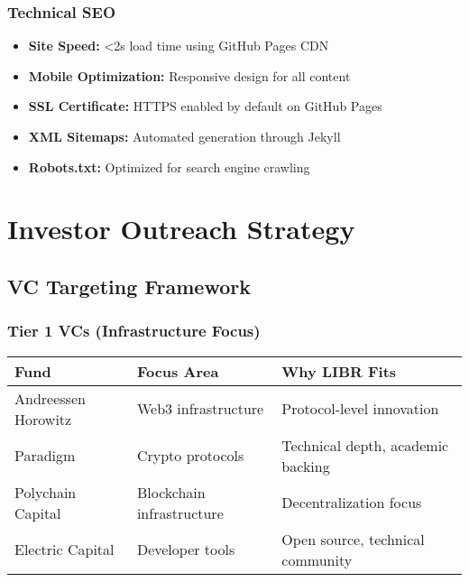 \documentclass[12pt,a4paper]{article}
\begin{document}
\subsubsection{Technical SEO}
\begin{itemize}
    \item \textbf{Site Speed:} <2s load time using GitHub Pages CDN
    \item \textbf{Mobile Optimization:} Responsive design for all content
    \item \textbf{SSL Certificate:} HTTPS enabled by default on GitHub Pages
    \item \textbf{XML Sitemaps:} Automated generation through Jekyll
    \item \textbf{Robots.txt:} Optimized for search engine crawling
\end{itemize}

\section{Investor Outreach Strategy}

\subsection{VC Targeting Framework}

\subsubsection{Tier 1 VCs (Infrastructure Focus)}
\begin{center}
\begin{tabular}{|p{3cm}|p{3cm}|p{5cm}|}
\hline
\textbf{Fund} & \textbf{Focus Area} & \textbf{Why LIBR Fits} \\
\hline
Andreessen Horowitz & Web3 infrastructure & Protocol-level innovation \\
\hline
Paradigm & Crypto protocols & Technical depth, academic backing \\
\hline
Polychain Capital & Blockchain infrastructure & Decentralization focus \\
\hline
Electric Capital & Developer tools & Open source, technical community \\
\hline
\end{tabular}
\end{center}
\end{document}
